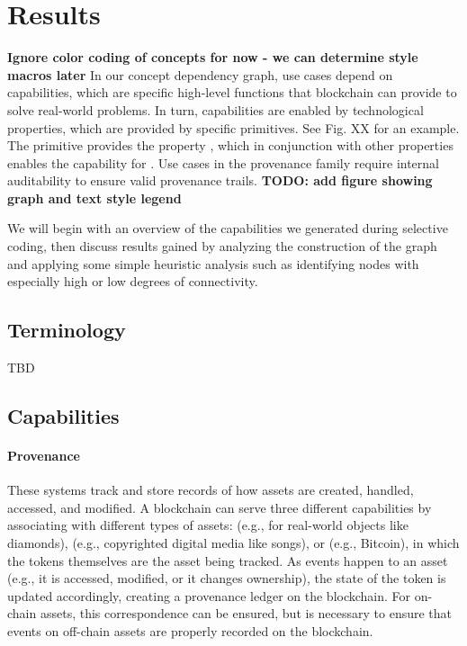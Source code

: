 
\section{Results}
\textbf{Ignore color coding of concepts for now - we can determine style macros later}
\newline
In our concept dependency graph, use cases depend on capabilities, which are specific high-level functions that blockchain can provide to solve real-world problems. In turn, capabilities are enabled by technological properties, which are provided by specific primitives. See Fig. XX for an example.  The primitive  provides the property , which in conjunction with other properties enables the capability for . Use cases in the provenance family require internal auditability to ensure valid provenance trails.
\textbf{TODO: add figure showing graph and text style legend}

We will begin with an overview of the capabilities we generated during selective coding, then discuss results gained by analyzing the construction of the graph and applying some simple heuristic analysis such as identifying nodes with especially high or low degrees of connectivity.

\subsection{Terminology}
TBD

\subsection{Capabilities}
\paragraph{Provenance} These systems track and store records of how assets are created, handled, accessed, and modified. A blockchain can serve three different capabilities by associating  with different types of assets:  (e.g., for real-world objects like diamonds),  (e.g., copyrighted digital media like songs), or  (e.g., Bitcoin), in which the tokens themselves are the asset being tracked. As events happen to an asset (e.g., it is accessed, modified, or it changes ownership), the state of the token is updated accordingly, creating a provenance ledger on the blockchain. For on-chain assets, this correspondence can be ensured, but  is necessary to ensure that events on off-chain assets are properly recorded on the blockchain.

